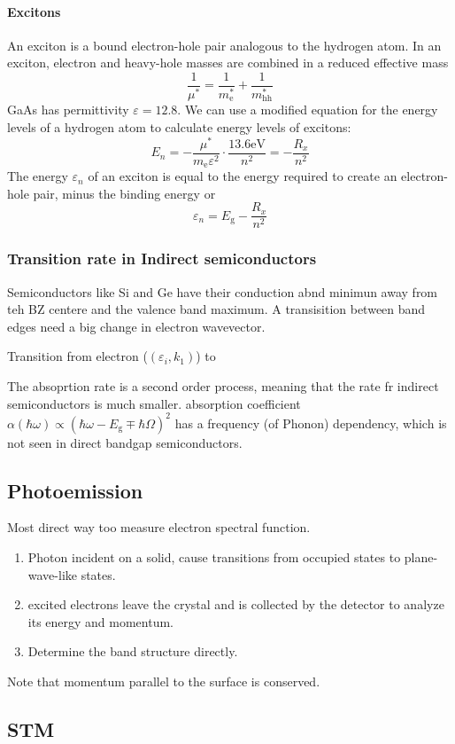 \documentclass[12pt,a4paper]{article}
\begin{document}
\paragraph{Excitons}
An exciton is a bound electron-hole pair analogous to the hydrogen atom. In an exciton, electron and heavy-hole masses are combined in a reduced effective mass
$$
\frac{1}{\mu^*}=\frac{1}{m_{\mathrm{e}}^*}+\frac{1}{m_{\mathrm{hh}}^*}
$$
GaAs has permittivity $\varepsilon=12.8$. We can use a modified equation for the energy levels of a hydrogen atom to calculate energy levels of excitons:
$$
E_n=-\frac{\mu^*}{m_{\mathrm{e}} \varepsilon^2} \cdot \frac{13.6 \mathrm{eV}}{n^2}=-\frac{R_x}{n^2}
$$
The energy $\varepsilon_n$ of an exciton is equal to the energy required to create an electron-hole pair, minus the binding energy or
$$
\varepsilon_n=E_{\mathrm{g}}-\frac{R_x}{n^2}
$$
\subsubsection{Transition rate in Indirect semiconductors}
Semiconductors like Si and Ge have their conduction abnd minimun away from teh BZ centere and the valence band maximum. A transisition between band edges need a big change in electron wavevector.

Transition from electron ($\left(\varepsilon_i, k_1\right)$) to 

The absoprtion rate is a second order process, meaning that the rate fr indirect semiconductors is much smaller.
absorption coefficient $\alpha(\hbar \omega) \propto\left(\hbar \omega-E_{\mathrm{g}} \mp \hbar \Omega\right)^2$ has a frequency (of Phonon) dependency, which is not seen in direct bandgap semiconductors.

\subsection{Photoemission}
Most direct way too measure electron spectral function.
\begin{enumerate}
    \item Photon incident on a solid, cause transitions from occupied states to plane-wave-like states.
    \item excited electrons leave the crystal and is collected by the detector to analyze its energy and momentum. 
    \item Determine the band structure directly.
\end{enumerate}
Note that momentum parallel to the surface is conserved.
\subsection{STM}
\end{document}
